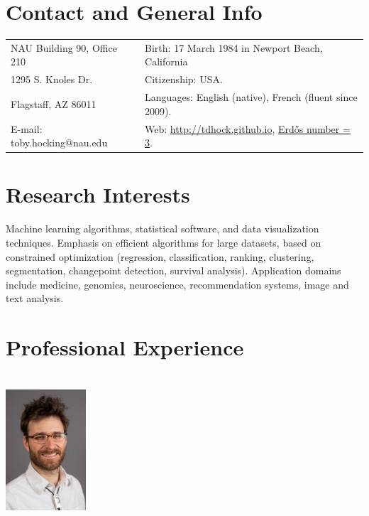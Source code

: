 \documentclass[margin,line]{res}
\begin{document}

\begin{resume}
\section{\sc Contact and General Info}
\vspace{.05in}
\begin{tabular*}{6.1in} {@{\extracolsep{\fill}}ll}
 NAU Building 90, Office 210 & Birth: 17 March 1984 in Newport Beach, California\\
 1295 S. Knoles Dr.  & Citizenship: USA. \\            
  Flagstaff, AZ 86011 & Languages: English (native), French
                        (fluent since 2009). \\
  E-mail:  toby.hocking@nau.edu & Web: \url{http://tdhock.github.io}, \href{https://tdhock.github.io/blog/2022/erdos-number/}{Erd\H{o}s number = 3}. \\
\end{tabular*}

\section{\sc Research Interests}

Machine learning algorithms, statistical software, and data
visualization techniques. Emphasis on efficient algorithms for large
datasets, based on constrained optimization (regression,
classification, ranking, clustering, segmentation, changepoint
detection, survival analysis). Application domains include medicine,
genomics, neuroscience, recommendation systems, image and text analysis.

\section{\sc Professional Experience \\ \hspace{0.1cm} \\ \includegraphics[width=3cm]{HOCKING-rectangle-lores.jpg}}


\end{resume}
\end{document}
